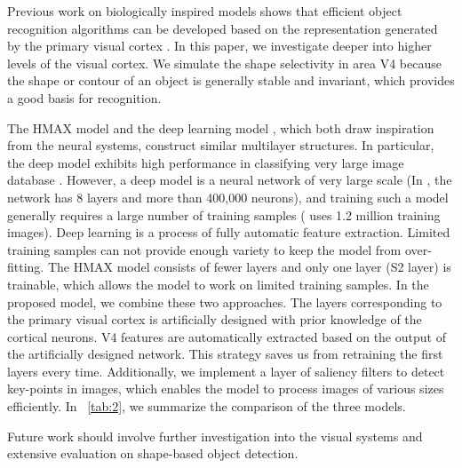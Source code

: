 \documentclass[twocolumn]{article}
\begin{document}
Previous work on biologically inspired models shows that efficient object recognition algorithms can be developed 
based on the representation generated by the primary visual cortex \cite{wei2014,wei2014b,zhao2013}.
In this paper, we investigate deeper into higher levels of the visual cortex.
We simulate the shape selectivity in area V4 because the shape or contour of an object is generally stable and invariant, which provides a good basis for recognition.

The HMAX model \cite{cadieu2007} and the deep learning model \cite{bengio2009}, which both draw inspiration from the neural systems, 
construct similar multilayer structures.
In particular, the deep model exhibits high performance in classifying very large image database \cite{krizhevsky2012}.
However, a deep model is a neural network of very large scale (In \cite{krizhevsky2012}, the network has 8 layers and more than 400,000 neurons),
and training such a model generally requires a large number of training samples (\cite{krizhevsky2012} uses 1.2 million training images).
Deep learning is a process of fully automatic feature extraction.
Limited training samples can not provide enough variety to keep the model from over-fitting.
The HMAX model consists of fewer layers and only one layer (S2 layer) is trainable, which allows the model to work on limited training samples.
In the proposed model, we combine these two approaches.
The layers corresponding to the primary visual cortex is artificially designed with prior knowledge of the cortical neurons.
V4 features are automatically extracted based on the output of the artificially designed network.
This strategy saves us from retraining the first layers every time.
Additionally, we implement a layer of saliency filters to detect key-points in images,
which enables the model to process images of various sizes efficiently. 
In \tablename~\ref{tab:2}, we summarize the comparison of the three models.

Future work should involve further investigation into the visual systems and extensive evaluation on shape-based object detection.



\end{document}
